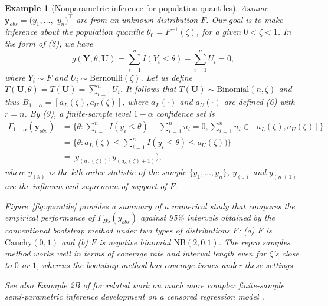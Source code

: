 \documentclass[12pt]{article}
\theoremstyle{shortspace}
\newtheorem{example}{\quad Example}
\def\*#1{\bm{#1}}
\begin{document}
\begin{example}[Nonparametric inference for population quantiles] \label{ex:crq} 
Assume $\*y_{obs} = (y_1, \ldots,$ $ y_n)^\top$ are from an unknown distribution $F$. Our goal is to make inference about the population quantile $\theta_0 = F^{-1}(\zeta)$, for a given $0<\zeta <1$. 
In the form of (8), 
we have 
$$
g(\*Y, \theta, \*U) = \sum_{i = 1}^n I(Y_i \leq \theta) - \sum_{i =1}^n U_i = 0,$$ 
where $Y_i \sim F$ and $U_i \sim \text{Bernoulli}(\zeta)$. 
Let us define $T(\*U, \theta) =  T(\*U) = \sum_{i =1}^n U_i$. It follows that $T(\*U) \sim \text{Binomial}(n, \zeta)$ and thus $B_{1 -\alpha} = [a_L(\zeta), a_U(\zeta)]$, where $a_L(\cdot)$ and $a_U(\cdot)$ are defined 
(6) 
with $r = n$. By (9), 
a finite-sample level $1 - \alpha$ confidence set is
\begin{align*}
\Gamma_{1-\alpha}(\*y_{obs}) & = \big\{\theta: \sum_{i = 1}^n I(y_i \leq \theta) - \sum_{i =1}^n u_i = 0, 
\sum_{i =1}^n u_i \in [a_L(\zeta), a_U(\zeta)]
\big\} 
\\ & = \big\{\theta: a_L(\zeta) \leq \sum_{i = 1}^n I(y_i \leq \theta) \leq a_U(\zeta))
\big\} \\ & = \big[y_{(a_L(\zeta))}, y_{(a_U(\zeta)+1)}\big),
\end{align*}
where 
$y_{(k)}$ is the $k$th order statistic
of the sample $\{y_1, \ldots, y_n\}$,  
$y_{(0)}$ and $y_{(n+1)}$ are the infimum and supremum of support of $F.$ 

Figure~\ref{fig:quantile} provides a 
summary of
a numerical study that  compares the empirical performance of $\Gamma_{.95}(y_{obs})$ 
against 95\% intervals obtained by the conventional bootstrap method under two types of distributions $F$: (a) $F$ is $\text{Cauchy}(0,1)$ and (b) $F$ is negative binomial  $\text{NB}(2, 0.1)$.
The repro samples method works well in terms of coverage rate and interval length even for $\zeta$'s close to $0$ or $1$, whereas the bootstrap method has coverage issues under these settings.


See also Example 2B of \cite{XieWang2022} for related work on much more complex finite-sample semi-parametric inference development on a censored regression model \citep{powell_censored_1986}. 




\end{example}
\end{document}
